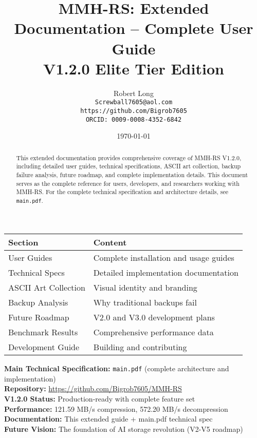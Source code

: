 \documentclass[11pt,a4paper]{article}
\title{MMH-RS: Extended Documentation -- Complete User Guide\\[1ex]\textbf{\large V1.2.0 Elite Tier Edition}}
\author{Robert Long \\ \texttt{Screwball7605@aol.com} \\ \texttt{https://github.com/Bigrob7605} \\ \texttt{ORCID: 0009-0008-4352-6842}}
\date{\today}
\begin{document}
	\maketitle
	\thispagestyle{empty}
	\begin{abstract}
		This extended documentation provides comprehensive coverage of MMH-RS V1.2.0, including detailed user guides, technical specifications, ASCII art collection, backup failure analysis, future roadmap, and complete implementation details. This document serves as the complete reference for users, developers, and researchers working with MMH-RS. For the complete technical specification and architecture details, see \texttt{main.pdf}.
	\end{abstract}

	\begin{center}
	\begin{tcolorbox}[colback=gray!5, colframe=gray!60, boxrule=0.7pt, arc=2pt, title=\textbf{\large MMH-RS Extended Documentation Contents}]
	\begin{tabular}{@{}ll@{}}
	\toprule
	\textbf{Section} & \textbf{Content} \\
	\midrule
	User Guides & Complete installation and usage guides \\
	Technical Specs & Detailed implementation documentation \\
	ASCII Art Collection & Visual identity and branding \\
	Backup Analysis & Why traditional backups fail \\
	Future Roadmap & V2.0 and V3.0 development plans \\
	Benchmark Results & Comprehensive performance data \\
	Development Guide & Building and contributing \\
	\bottomrule
	\end{tabular}
	\end{tcolorbox}
	\end{center}

	\begin{calloutbox}
	\textbf{Main Technical Specification:} \texttt{main.pdf} (complete architecture and implementation) \\
	\textbf{Repository:} \url{https://github.com/Bigrob7605/MMH-RS} \\
	\textbf{V1.2.0 Status:} Production-ready with complete feature set \\
	\textbf{Performance:} 121.59 MB/s compression, 572.20 MB/s decompression \\
	\textbf{Documentation:} This extended guide + main.pdf technical spec \\
	\textbf{Future Vision:} The foundation of AI storage revolution (V2-V5 roadmap)
	\end{calloutbox}
	
\end{document}
